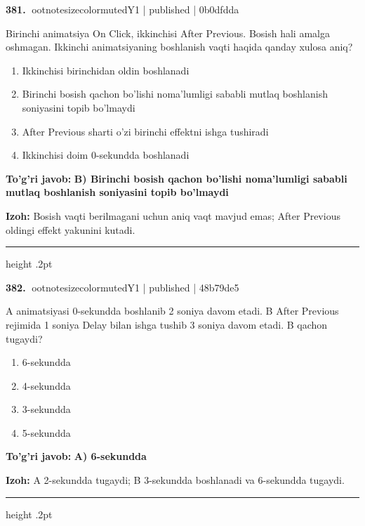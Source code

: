 \documentclass[10pt,a4paper]{article}
\begin{document}
\textbf{\color{ink}381.} {ootnotesizecolor{muted}Y1 | published | 0b0dfdda}
\par
Birinchi animatsiya On Click, ikkinchisi After Previous. Bosish hali amalga oshmagan. Ikkinchi animatsiyaning boshlanish vaqti haqida qanday xulosa aniq?
\begin{enumerate}[label=\Alph*),leftmargin=9mm]
\item Ikkinchisi birinchidan oldin boshlanadi
\item Birinchi bosish qachon bo'lishi noma'lumligi sababli mutlaq boshlanish soniyasini topib bo'lmaydi
\item After Previous sharti o'zi birinchi effektni ishga tushiradi
\item Ikkinchisi doim 0-sekundda boshlanadi
\end{enumerate}
\begin{tcolorbox}[enhanced,breakable,colback=teal!4,colframe=teal!55!black,boxrule=0.45pt,arc=1.2mm,left=2.8mm,right=2.8mm,top=2mm,bottom=2mm]
\textbf{\color{teal}To'g'ri javob:} \textbf{B) Birinchi bosish qachon bo'lishi noma'lumligi sababli mutlaq boshlanish soniyasini topib bo'lmaydi}
\par\smallskip
\textbf{Izoh:} Bosish vaqti berilmagani uchun aniq vaqt mavjud emas; After Previous oldingi effekt yakunini kutadi.
\end{tcolorbox}
\vspace{2mm}\hrule height .2pt\vspace{2mm}

\textbf{\color{ink}382.} {ootnotesizecolor{muted}Y1 | published | 48b79de5}
\par
A animatsiyasi 0-sekundda boshlanib 2 soniya davom etadi. B After Previous rejimida 1 soniya Delay bilan ishga tushib 3 soniya davom etadi. B qachon tugaydi?
\begin{enumerate}[label=\Alph*),leftmargin=9mm]
\item 6-sekundda
\item 4-sekundda
\item 3-sekundda
\item 5-sekundda
\end{enumerate}
\begin{tcolorbox}[enhanced,breakable,colback=teal!4,colframe=teal!55!black,boxrule=0.45pt,arc=1.2mm,left=2.8mm,right=2.8mm,top=2mm,bottom=2mm]
\textbf{\color{teal}To'g'ri javob:} \textbf{A) 6-sekundda}
\par\smallskip
\textbf{Izoh:} A 2-sekundda tugaydi; B 3-sekundda boshlanadi va 6-sekundda tugaydi.
\end{tcolorbox}
\vspace{2mm}\hrule height .2pt\vspace{2mm}
\end{document}
